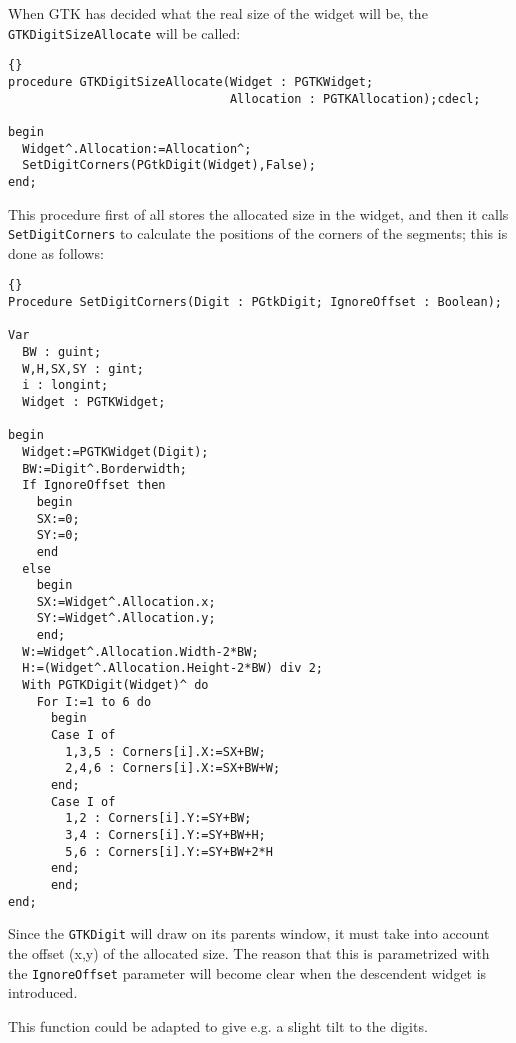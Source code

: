 \documentclass[10pt]{article}
\begin{document}
When GTK has decided what the real size of the widget will be, the
\lstinline|GTKDigitSizeAllocate| will be called:
\begin{lstlisting}{}
procedure GTKDigitSizeAllocate(Widget : PGTKWidget;
                               Allocation : PGTKAllocation);cdecl;
  
begin
  Widget^.Allocation:=Allocation^;
  SetDigitCorners(PGtkDigit(Widget),False);
end;
\end{lstlisting}
This procedure first of all stores the allocated size in the widget, and
then it calls \lstinline|SetDigitCorners| to calculate the positions of
the corners of the segments; this is done as follows:
\begin{lstlisting}{}
Procedure SetDigitCorners(Digit : PGtkDigit; IgnoreOffset : Boolean);

Var
  BW : guint;
  W,H,SX,SY : gint;
  i : longint;
  Widget : PGTKWidget;
  
begin
  Widget:=PGTKWidget(Digit);
  BW:=Digit^.Borderwidth;
  If IgnoreOffset then
    begin
    SX:=0;
    SY:=0;
    end
  else
    begin
    SX:=Widget^.Allocation.x;
    SY:=Widget^.Allocation.y;
    end;
  W:=Widget^.Allocation.Width-2*BW;
  H:=(Widget^.Allocation.Height-2*BW) div 2;  
  With PGTKDigit(Widget)^ do
    For I:=1 to 6 do
      begin
      Case I of
        1,3,5 : Corners[i].X:=SX+BW;
        2,4,6 : Corners[i].X:=SX+BW+W;
      end;
      Case I of
        1,2 : Corners[i].Y:=SY+BW;
        3,4 : Corners[i].Y:=SY+BW+H;
        5,6 : Corners[i].Y:=SY+BW+2*H
      end;
      end;
end;
\end{lstlisting} 
Since the \lstinline|GTKDigit| will draw on its parents window, it must
take into account the offset (x,y) of the allocated size. The reason that
this is parametrized with the \lstinline|IgnoreOffset| parameter will become
clear when the descendent widget is introduced.

This function could be adapted to give e.g. a slight tilt to the digits. 
\end{document}
